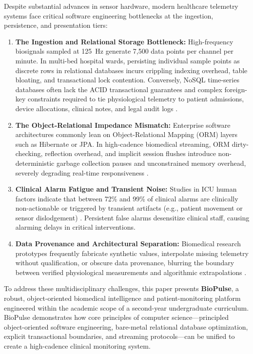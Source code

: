 \documentclass[10pt,journal,compsoc]{IEEEtran}
\begin{document}
Despite substantial advances in sensor hardware, modern healthcare telemetry systems face critical software engineering bottlenecks at the ingestion, persistence, and presentation tiers:
\begin{enumerate}
    \item \textbf{The Ingestion and Relational Storage Bottleneck:} High-frequency biosignals sampled at 125~Hz generate 7,500 data points per channel per minute. In multi-bed hospital wards, persisting individual sample points as discrete rows in relational databases incurs crippling indexing overhead, table bloating, and transactional lock contention. Conversely, NoSQL time-series databases often lack the ACID transactional guarantees and complex foreign-key constraints required to tie physiological telemetry to patient admissions, device allocations, clinical notes, and legal audit logs \cite{stonebraker2005one,fowler2002patterns}.
    \item \textbf{The Object-Relational Impedance Mismatch:} Enterprise software architectures commonly lean on Object-Relational Mapping (ORM) layers such as Hibernate or JPA. In high-cadence biomedical streaming, ORM dirty-checking, reflection overhead, and implicit session flushes introduce non-deterministic garbage collection pauses and unconstrained memory overhead, severely degrading real-time responsiveness \cite{fowler2002patterns,bloch2018effective}.
    \item \textbf{Clinical Alarm Fatigue and Transient Noise:} Studies in ICU human factors indicate that between 72\% and 99\% of clinical alarms are clinically non-actionable or triggered by transient artifacts (e.g., patient movement or sensor dislodgement) \cite{xu2025alarm,imhoff2006alarm}. Persistent false alarms desensitize clinical staff, causing alarming delays in critical interventions.
    \item \textbf{Data Provenance and Architectural Separation:} Biomedical research prototypes frequently fabricate synthetic values, interpolate missing telemetry without qualification, or obscure data provenance, blurring the boundary between verified physiological measurements and algorithmic extrapolations \cite{walonoski2018synthea,yuan2025ai}.
\end{enumerate}

To address these multidisciplinary challenges, this paper presents \textbf{BioPulse}, a robust, object-oriented biomedical intelligence and patient-monitoring platform engineered within the academic scope of a second-year undergraduate curriculum. BioPulse demonstrates how core principles of computer science—principled object-oriented software engineering, bare-metal relational database optimization, explicit transactional boundaries, and streaming protocols—can be unified to create a high-cadence clinical monitoring system.
\end{document}
